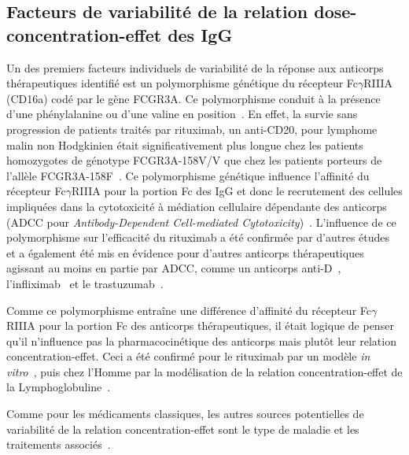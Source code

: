 \subsection{Facteurs de variabilité de la relation dose-concentration-effet des IgG}
Un des premiers facteurs individuels de variabilité de la réponse aux anticorps thérapeutiques identifié est un polymorphisme génétique du récepteur Fc$\gamma$RIIIA (CD16a) codé par le gène FCGR3A. Ce polymorphisme conduit à la présence d'une phénylalanine ou d'une valine en position~\citep{REF158}. En effet, la survie sans progression de patients traités par rituximab, un anti-CD20, pour lymphome malin non Hodgkinien était significativement plus longue chez les patients homozygotes de génotype FCGR3A-158V/V que chez les patients porteurs de l'allèle FCGR3A-158F~\citep{REF82}. Ce polymorphisme génétique influence l'affinité du récepteur Fc$\gamma$RIIIA pour la portion Fc des IgG et donc le recrutement des cellules impliquées dans la cytotoxicité à médiation cellulaire dépendante des anticorps (ADCC pour \textit{Antibody-Dependent Cell-mediated Cytotoxicity})~\citep{REF83, REF84}. L'influence de ce polymorphisme sur l'efficacité du rituximab a été confirmée par d'autres études~\citep{REF85, REF86} et a également été mis en évidence pour d'autres anticorps thérapeutiques agissant au moins en partie par ADCC, comme un anticorps anti-D~\citep{REF87}, l'infliximab~\citep{REF88} et le trastuzumab~\citep{REF89}.

Comme ce polymorphisme entraîne une différence d'affinité du récepteur Fc$\gamma$RIIIA pour la portion Fc des anticorps thérapeutiques, il était logique de penser qu'il n'influence pas la pharmacocinétique des anticorps mais plutôt leur relation concentration-effet. Ceci a été confirmé pour le rituximab par un modèle \textit{in vitro}~\citep{REF83}, puis chez l'Homme par la modélisation de la relation concentration-effet de la Lymphoglobuline~\citep{REF86}.

Comme pour les médicaments classiques, les autres sources potentielles de variabilité de la relation concentration-effet sont le type de maladie et les traitements associés~\citep{REF7}. 

